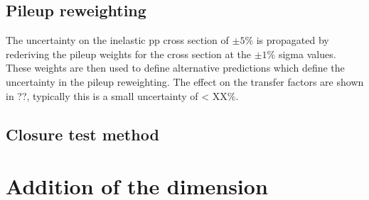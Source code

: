 \subsection{Pileup reweighting}

The uncertainty on the inelastic pp cross section of $\pm5\%$ is propagated by rederiving the pileup
weights for the cross section at the $\pm1\%$ sigma values. These weights are then used to define 
alternative predictions which define the uncertainty in the pileup reweighting. The effect on the 
transfer factors are shown in ??, typically this is a small uncertainty of < XX\%.
\subsection{Closure test method}
\section{Addition of the \mht dimension}
